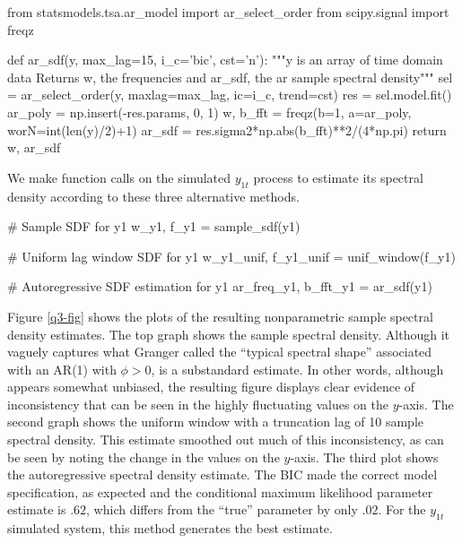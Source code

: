 \documentclass[oneside, a4paper]{amsart}
\begin{document}
 
\begin{python3code}              
from statsmodels.tsa.ar_model import ar_select_order
from scipy.signal import freqz

def ar_sdf(y, max_lag=15, i_c='bic', cst='n'):
    """y is an array of time domain data 
    Returns w, the frequencies and ar_sdf, the ar sample spectral density"""
    sel = ar_select_order(y, maxlag=max_lag, ic=i_c, trend=cst)
    res = sel.model.fit()
    ar_poly = np.insert(-res.params, 0, 1)
    w, b_fft = freqz(b=1, a=ar_poly, worN=int(len(y)/2)+1)
    ar_sdf = res.sigma2*np.abs(b_fft)**2/(4*np.pi)
    return w, ar_sdf
\end{python3code}    
We make function calls on the simulated $y_{1t}$ process to estimate its spectral density according to these three alternative methods. 
\begin{python3code}        
# Sample SDF for y1
w_y1, f_y1 = sample_sdf(y1)

# Uniform lag window SDF for y1
w_y1_unif, f_y1_unif = unif_window(f_y1)

# Autoregressive SDF estimation for y1
ar_freq_y1, b_fft_y1 = ar_sdf(y1)
\end{python3code}
Figure \ref{q3-fig} shows the plots of the resulting nonparametric sample spectral density estimates. The top graph shows the sample spectral density. Although it vaguely captures what Granger called the ``typical spectral shape'' associated with an AR(1) with $\phi > 0$, is a substandard estimate. In other words, although appears somewhat unbiased, the resulting figure displays clear evidence of inconsistency that can be seen in the highly fluctuating values on the $y$-axis. The second graph shows the uniform window with a truncation lag of 10 sample spectral density. This estimate smoothed out much of this inconsistency, as can be seen by noting the change in the values on the $y$-axis. The third plot shows the autoregressive spectral density estimate. The BIC made the correct model specification, as expected and the conditional maximum likelihood parameter estimate is $.62$, which differs from the ``true'' parameter by only $.02$. For the $y_{1t}$ simulated system, this method generates the best estimate. 
\end{document}
